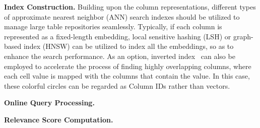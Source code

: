 
\noindent\textbf{Index Construction.} Building upon the  column representations, different types of approximate nearest neighbor (ANN) search indexes should be utilized to manage large table repositories seamlessly. Typically, if each column is represented as a fixed-length embedding, local sensitive hashing (LSH) or graph-based index (HNSW) can be utilized to index all the embeddings, so as to enhance the search performance.
 As an option, inverted index~\cite{} can also be employed  to  accelerate the process of finding highly overlapping columns, where each cell value is mapped with the columns that contain the value. In this case, these colorful circles can be regarded as  Column IDs rather than vectors.






\noindent\textbf{Online Query Processing.}


\noindent\textbf{Relevance Score Computation.}


